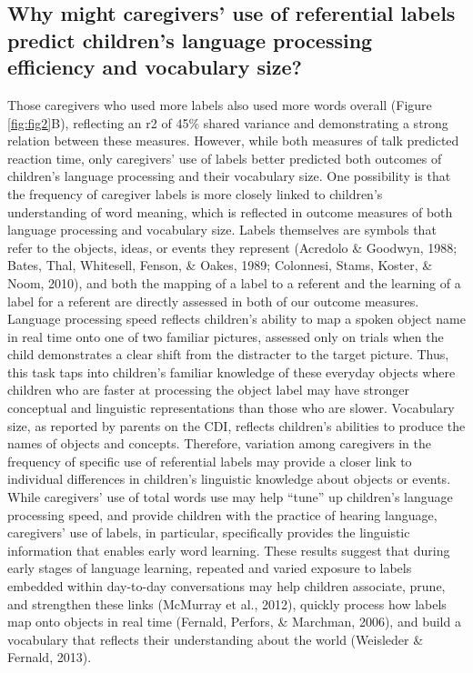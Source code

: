 \documentclass[
  english,
  man,mask]{apa6}
\begin{document}
\hypertarget{why-might-caregivers-use-of-referential-labels-predict-childrens-language-processing-efficiency-and-vocabulary-size}{%
\subsection{Why might caregivers' use of referential labels predict children's language processing efficiency and vocabulary size?}\label{why-might-caregivers-use-of-referential-labels-predict-childrens-language-processing-efficiency-and-vocabulary-size}}

Those caregivers who used more labels also used more words overall (Figure \ref{fig:fig2}B), reflecting an r2 of 45\% shared variance and demonstrating a strong relation between these measures. However, while both measures of talk predicted reaction time, only caregivers' use of labels better predicted both outcomes of children's language processing and their vocabulary size. One possibility is that the frequency of caregiver labels is more closely linked to children's understanding of word meaning, which is reflected in outcome measures of both language processing and vocabulary size. Labels themselves are symbols that refer to the objects, ideas, or events they represent (Acredolo \& Goodwyn, 1988; Bates, Thal, Whitesell, Fenson, \& Oakes, 1989; Colonnesi, Stams, Koster, \& Noom, 2010), and both the mapping of a label to a referent and the learning of a label for a referent are directly assessed in both of our outcome measures. Language processing speed reflects children's ability to map a spoken object name in real time onto one of two familiar pictures, assessed only on trials when the child demonstrates a clear shift from the distracter to the target picture. Thus, this task taps into children's familiar knowledge of these everyday objects where children who are faster at processing the object label may have stronger conceptual and linguistic representations than those who are slower. Vocabulary size, as reported by parents on the CDI, reflects children's abilities to produce the names of objects and concepts. Therefore, variation among caregivers in the frequency of specific use of referential labels may provide a closer link to individual differences in children's linguistic knowledge about objects or events. While caregivers' use of total words use may help \enquote{tune} up children's language processing speed, and provide children with the practice of hearing language, caregivers' use of labels, in particular, specifically provides the linguistic information that enables early word learning. These results suggest that during early stages of language learning, repeated and varied exposure to labels embedded within day-to-day conversations may help children associate, prune, and strengthen these links (McMurray et al., 2012), quickly process how labels map onto objects in real time (Fernald, Perfors, \& Marchman, 2006), and build a vocabulary that reflects their understanding about the world (Weisleder \& Fernald, 2013).
\end{document}

